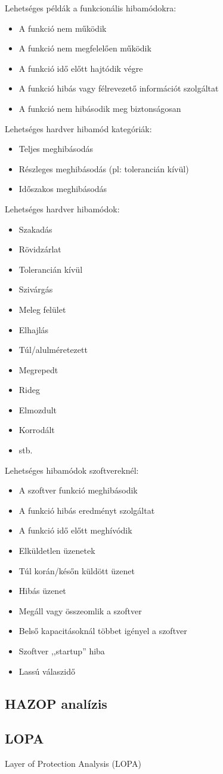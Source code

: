 Lehetséges példák a funkcionális hibamódokra:
\begin{itemize}
    \item A funkció nem működik
    \item A funkció nem megfelelően működik
    \item A funkció idő előtt hajtódik végre
    \item A funkció hibás vagy félrevezető információt szolgáltat
    \item A funkció nem hibásodik meg biztonságosan
\end{itemize}
Lehetséges hardver hibamód kategóriák:
\begin{itemize}
    \item Teljes meghibásodás
    \item Részleges meghibásodás (pl: tolerancián kívül)
    \item Időszakos meghibásodás
\end{itemize}
Lehetséges hardver hibamódok:
\begin{itemize}
    \item Szakadás
    \item Rövidzárlat
    \item Tolerancián kívül
    \item Szivárgás
    \item Meleg felület
    \item Elhajlás
    \item Túl/alulméretezett
    \item Megrepedt
    \item Rideg
    \item Elmozdult
    \item Korrodált
    \item stb.
\end{itemize}
Lehetséges hibamódok szoftvereknél:
\begin{itemize}
    \item A szoftver funkció meghibásodik
    \item A funkció hibás eredményt szolgáltat
    \item A funkció idő előtt meghívódik
    \item Elküldetlen üzenetek
    \item Túl korán/későn küldött üzenet
    \item Hibás üzenet
    \item Megáll vagy összeomlik a szoftver
    \item Belső kapacitásoknál többet igényel a szoftver
    \item Szoftver ,,startup'' hiba
    \item Lassú válaszidő
\end{itemize}

\subsection{HAZOP analízis}

\subsection{LOPA}
Layer of Protection Analysis (LOPA) \cite{LOPA1}